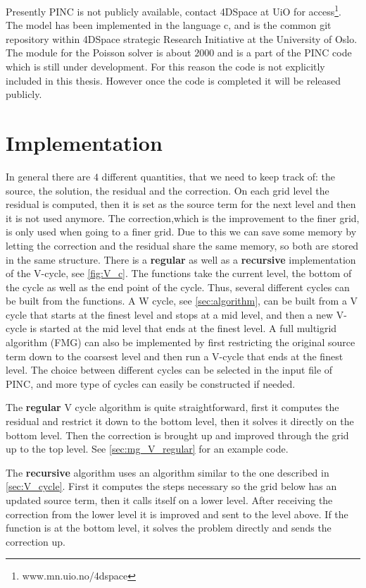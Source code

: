 Presently PINC is not publicly available, contact 4DSpace at UiO for access\footnote{www.mn.uio.no/4dspace}.
The model has been implemented in the language c, and is the common git repository
within 4DSpace strategic Research Initiative at the University of Oslo.
The module for the Poisson solver is about \(2000\) and is a part of the PINC code which is
still under development. For this reason the code is not explicitly included in this thesis.
However once the code is completed it will be released publicly.

\section{Implementation}
	In general there are \(4\) different quantities, that we need to keep track of: the source, the solution, the residual and the correction.
	On each grid level the residual is computed, then it is set as the source term for the next level and then it is not used anymore.
	The correction,which is the improvement to the finer grid, is only used when going to a finer grid. Due to this we can save some memory by
	letting the correction and the residual share the same memory, so both are stored in the same structure. There is a \textbf{regular} as well as a \textbf{recursive} implementation
	of the V-cycle, see \cref{fig:V_c}. The functions take the current level, the bottom of the cycle as well as the end point of the cycle. Thus, several different cycles
	can be built from the functions. A W cycle, see \cref{sec:algorithm}, can be built from a V cycle that starts at the finest level and stops at a mid level, and then a new V-cycle is started at
	the mid level that ends at the finest level. A full multigrid algorithm (FMG) can also be implemented by first restricting the original source term down to the coarsest
	level and then run a V-cycle that ends at the finest level. The choice between different cycles can be selected in the input file of PINC,
	and more type of cycles can easily be constructed if needed.

	The \textbf{regular} V cycle algorithm is quite straightforward, first it computes the residual and restrict it down to the bottom level,
	then it solves it directly on the bottom level. Then the correction is brought up and improved through the grid up to the top level.
	See \cref{sec:mg_V_regular} for an example code.

	The \textbf{recursive} algorithm uses an algorithm similar to the one described in \cref{sec:V_cycle}. First it computes the steps necessary
	so the grid below has an updated source term, then it calls itself on a lower level. After receiving the correction from
	the lower level it is improved and sent to the level above. If the function is at the bottom level, it solves the problem directly and sends
	the correction up.

